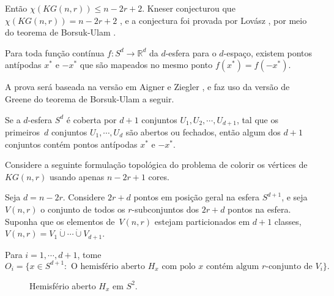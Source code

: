 Então $\chi(KG(n,r))\leq n-2r+2$. Kneser conjecturou que $\chi(KG(n,r)) = n-2r+2$ \cite{kneser1955aufgabe}, e a conjectura foi provada por Lovász \cite{lovasz1978kneser}, por meio do teorema de Borsuk-Ulam \cite{borsuk1933drei}.

\begin{teorema}\label{thborsukulam}
Para toda função contínua $f: S^d \rightarrow\mathbb{R}^d$ da $d$-esfera para o $d$-espaço, existem pontos antípodas $x^*$ e $-x^*$ que são mapeados no mesmo ponto $f(x^*) = f(-x^*)$.
\end{teorema}

A prova será baseada na versão em Aigner e Ziegler \cite{aigner2010proofs}, e faz uso da versão de Greene do teorema de Borsuk-Ulam \cite{greene2002new} a seguir.

\begin{teorema}\label{thgreene}
Se a $d$-esfera $S^d$ é coberta por $d+1$ conjuntos $U_1, U_2, \cdots, U_{d+1}$, tal que os primeiros~$d$ conjuntos $U_1,\cdots,U_d$ são abertos ou fechados, então algum dos $d+1$ conjuntos contém pontos antípodas $x^*$ e $-x^*$.
\end{teorema}

Considere a seguinte formulação topológica do problema de colorir os vértices de $KG(n,r)$ usando apenas $n-2r+1$ cores.

Seja $d = n - 2r$. Considere $2r+d$ pontos em posição geral na esfera $S^{d+1}$, e seja $V(n,r)$ o conjunto de todos os $r$-subconjuntos dos $2r+d$ pontos na esfera. Suponha que os elementos de~$V(n,r)$ estejam particionados em $d+1$ classes, $V(n,r) = V_1 \dot\cup \cdots \dot\cup V_{d+1}$.

Para $i=1,\cdots,d+1$, tome \[O_i = \{x\in S^{d+1} : \text{ O hemisfério aberto } H_x \text{ com polo } x \text{ contém algum } r\text{-conjunto de } V_i\}.\]

\begin{figure}[H]
\centering
{}
\caption{Hemisfério aberto $H_x$ em $S^2$.}
\label{fig:kneserhemisphere}
\end{figure}

